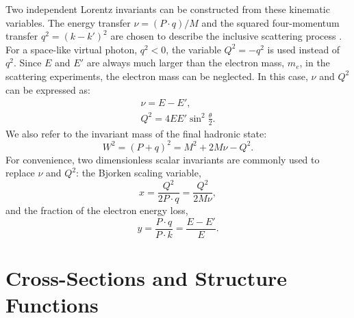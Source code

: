 Two independent Lorentz invariants can be constructed from these kinematic variables. The energy transfer $\nu=(P\cdot q)/M$ and the squared four-momentum transfer $q^2=(k-k')^2$ are chosen to describe the inclusive scattering process \cite{Halzen1984}. For a space-like virtual photon, $q^2<0$, the variable $Q^2=-q^2$ is used instead of $q^2$. Since $E$ and $E'$ are always much larger than the electron mass, $m_e$, in the scattering experiments, the electron mass can be neglected. In this case, $\nu$ and $Q^2$ can be expressed as:
\begin{gather} \label{C2S1E1}
\nu = E-E', \\ \label{C2S1E2}
Q^2 = 4EE'\sin^2\frac{\theta}{2}.
\end{gather}
We also refer to the invariant mass of the final hadronic state:
\begin{equation} \label{C2S1E3}
W^2 = (P+q)^2 = M^2+2M\nu-Q^2.
\end{equation}
For convenience, two dimensionless scalar invariants are commonly used to replace $\nu$ and $Q^2$: the Bjorken scaling variable,
\begin{equation}  \label{C2S1E4}
x = \frac{Q^2}{2P\cdot q}=\frac{Q^2}{2M\nu},
\end{equation}
and the fraction of the electron energy loss,
\begin{equation} \label{C2S1E5}
y = \frac{P\cdot q}{P\cdot k}=\frac{E-E'}{E}.
\end{equation}

\hspace{1cm} \newline

\section{Cross-Sections and Structure Functions}
\label{C2S2}

